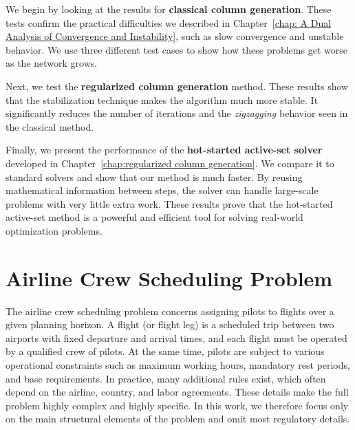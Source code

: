 \documentclass{book}
\theoremstyle{definition}
\newcounter{algorithm_}
\numberwithin{algorithm_}{chapter}
\begin{document}
{\medskip

We begin by looking at the results for \textbf{classical column generation}. These tests confirm the practical difficulties we described in Chapter~\ref{chap: A Dual Analysis of Convergence and Instability}, such as slow convergence and unstable behavior. We use three different test cases to show how these problems get worse as the network grows.

\medskip

Next, we test the \textbf{regularized column generation} method. These results show that the stabilization technique makes the algorithm much more stable. It significantly reduces the number of iterations and the \textit{zigzagging} behavior seen in the classical method.

\medskip

Finally, we present the performance of the \textbf{hot-started active-set solver} developed in Chapter~\ref{chap:regularized column generation}. We compare it to standard solvers and show that our method is much faster. By reusing mathematical information between steps, the solver can handle large-scale problems with very little extra work. These results prove that the hot-started active-set method is a powerful and efficient tool for solving real-world optimization problems.

\vspace*{\fill}



\newpage


\section{Airline Crew Scheduling Problem}

The airline crew scheduling problem concerns assigning pilots to flights over a given planning horizon. A flight (or flight leg) is a scheduled trip between two airports with fixed departure and arrival times, and each flight must be operated by a qualified crew of pilots. At the same time, pilots are subject to various operational constraints such as maximum working hours, mandatory rest periods, and base requirements.
In practice, many additional rules exist, which often depend on the airline, country, and labor agreements. These details make the full problem highly complex and highly specific. In this work, we therefore focus only on the main structural elements of the problem and omit most regulatory details.

\bigskip

}
\end{document}
